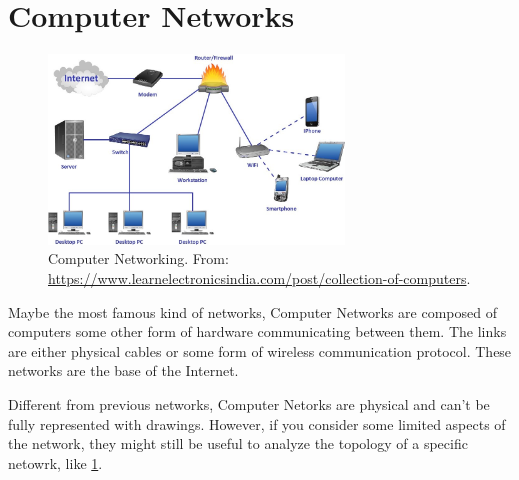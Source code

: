 \section{Computer Networks}

    \begin{figure}[H]
        \centering
        \includegraphics[width=0.7\textwidth]{images/e073f6.jpg}

        \caption{Computer Networking. From: \url{https://www.learnelectronicsindia.com/post/collection-of-computers}.}
        \label{fig:intranet}
    \end{figure}

    Maybe the most famous kind of networks, Computer Networks are composed of computers some other form of hardware communicating between them. The links are either physical cables or some form of wireless communication protocol. These networks are the base of the Internet.

    Different from previous networks, Computer Netorks are physical and can't be fully represented with drawings. However, if you consider some limited aspects of the network, they might still be useful to analyze the topology of a specific netowrk, like \cref{fig:intranet}.
